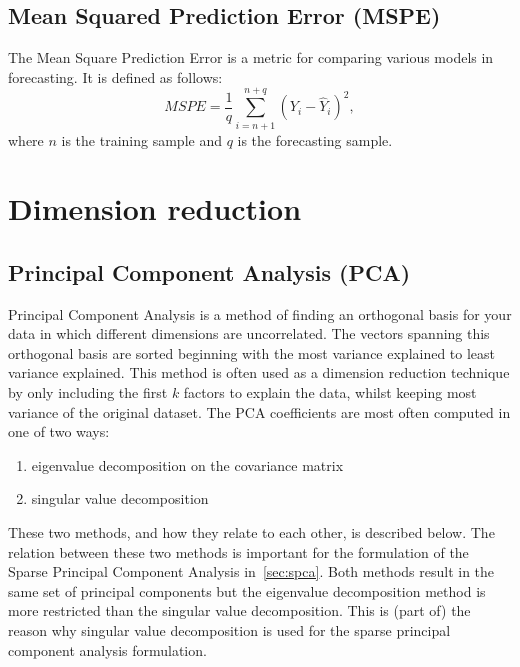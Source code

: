 \subsection{Mean Squared Prediction Error (MSPE)}
\label{sec:mspe}
The Mean Square Prediction Error is a metric for comparing various models in forecasting.
It is defined as follows:
\begin{equation}
	MSPE = \frac{1}{q} \sum_{i=n+1}^{n+q} \left(Y_i - \hat{Y}_i \right)^2,
\end{equation}
where $n$ is the training sample and $q$ is the forecasting sample.

\section{Dimension reduction}
\label{sec:dimension-reduction}
\subsection{Principal Component Analysis (PCA)}
Principal Component Analysis is a method of finding an orthogonal basis for your data in which different dimensions are uncorrelated. 
The vectors spanning this orthogonal basis are sorted beginning with the most variance explained to least variance explained. 
This method is often used as a dimension reduction technique by only including the first $k$ factors to explain the data, whilst keeping most variance of the original dataset. 
The PCA coefficients are most often computed in one of two ways:
\begin{enumerate}
	\item eigenvalue decomposition on the covariance matrix
	\item singular value decomposition
\end{enumerate}
These two methods, and how they relate to each other, is described below. 
The relation between these two methods is important for the formulation of the Sparse Principal Component Analysis in~\cref{sec:spca}.
Both methods result in the same set of principal components but the eigenvalue decomposition method is more restricted than the singular value decomposition. 
This is (part of) the reason why singular value decomposition is used for the sparse principal component analysis formulation.


